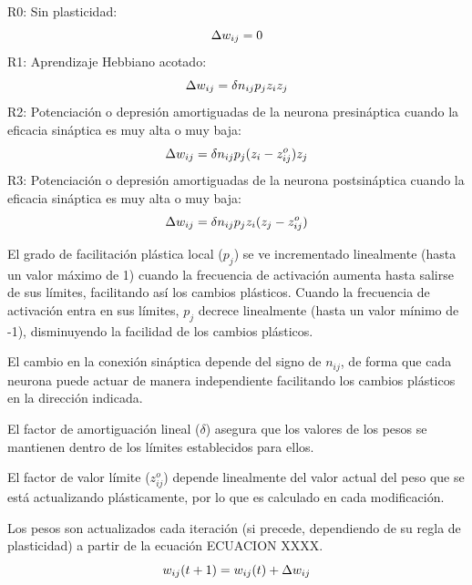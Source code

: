 \noindent
R0: Sin plasticidad:
\begin{equation} \label{eq:R0plasticityRule}
 \centering
 \Delta w_{ij}= 0
\end{equation}
\noindent
R1: Aprendizaje Hebbiano acotado:
\begin{equation} \label{eq:R1plasticityRule}
 \centering
 \Delta w_{ij}= \delta n_{ij} p_{j} z_{i} z_{j}
\end{equation}
\noindent
R2: Potenciación o depresión amortiguadas de la neurona presináptica cuando la eficacia sináptica es muy alta o muy baja:
\begin{equation} \label{eq:R2plasticityRule}
 \centering
 \Delta w_{ij}= \delta n_{ij} p_{j} (z_{i} - z_{ij}^{o}) z_{j}
\end{equation}
\noindent
R3: Potenciación o depresión amortiguadas de la neurona postsináptica cuando la eficacia sináptica es muy alta o muy baja:
\begin{equation} \label{eq:R3plasticityRule}
 \centering
 \Delta w_{ij}= \delta n_{ij} p_{j} z_{i} (z_{j} - z_{ij}^{o})
\end{equation}

El grado de facilitación plástica local ($p_{j}$) se ve incrementado linealmente (hasta un valor máximo de 1) cuando la frecuencia de activación aumenta hasta salirse de sus límites, facilitando
así los cambios plásticos. Cuando la frecuencia de activación entra en sus límites, $p_{j}$ decrece linealmente (hasta un valor mínimo de -1), disminuyendo la facilidad de los cambios plásticos.

El cambio en la conexión sináptica depende del signo de $n_{ij}$, de forma que cada neurona puede actuar de manera independiente facilitando los cambios plásticos en la dirección indicada.

El factor de amortiguación lineal ($\delta$) asegura que los valores de los pesos se mantienen dentro de los límites establecidos para ellos.

El factor de valor límite ($z_{ij}^{o}$) depende linealmente del valor actual del peso que se está actualizando plásticamente, por lo que es calculado en cada modificación.

Los pesos son actualizados cada iteración (si precede, dependiendo de su regla de plasticidad) a partir de la ecuación ECUACION XXXX.
\begin{equation} \label{eq:WeightUpdate}
 \centering
 w_{ij}(t+1) = w_{ij}(t) + \Delta w_{ij}
\end{equation}



